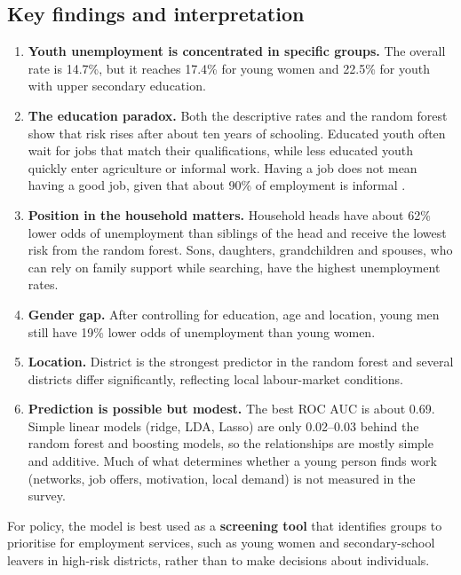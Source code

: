 \documentclass[11pt,a4paper]{article}
\begin{document}
\subsection{Key findings and interpretation}
\begin{enumerate}
\item \textbf{Youth unemployment is concentrated in specific groups.} The overall rate is 14.7\%, but
      it reaches 17.4\% for young women and 22.5\% for youth with upper secondary education.
\item \textbf{The education paradox.} Both the descriptive rates and the random forest show that risk
      rises after about ten years of schooling. Educated youth often wait for jobs that match their
      qualifications, while less educated youth quickly enter agriculture or informal work. Having a
      job does not mean having a good job, given that about 90\% of employment is informal
      \cite{nisr_annual}.
\item \textbf{Position in the household matters.} Household heads have about 62\% lower odds of
      unemployment than siblings of the head and receive the lowest risk from the random forest. Sons,
      daughters, grandchildren and spouses, who can rely on family support while searching, have the
      highest unemployment rates.
\item \textbf{Gender gap.} After controlling for education, age and location, young men still have
      19\% lower odds of unemployment than young women.
\item \textbf{Location.} District is the strongest predictor in the random forest and several
      districts differ significantly, reflecting local labour-market conditions.
\item \textbf{Prediction is possible but modest.} The best ROC AUC is about 0.69. Simple linear models
      (ridge, LDA, Lasso) are only 0.02--0.03 behind the random forest and boosting models, so the relationships are mostly
      simple and additive. Much of what determines whether a young person finds work (networks, job
      offers, motivation, local demand) is not measured in the survey.
\end{enumerate}
For policy, the model is best used as a \textbf{screening tool} that identifies groups to prioritise
for employment services, such as young women and secondary-school leavers in high-risk districts,
rather than to make decisions about individuals.
\end{document}
